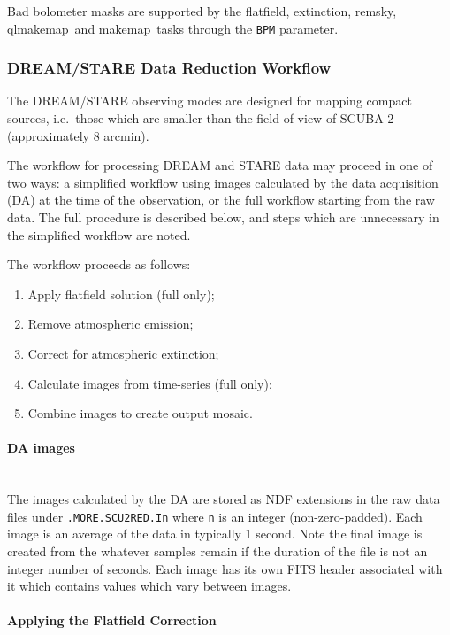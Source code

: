 \documentclass[twoside,11pt]{article}
\newcommand{\xref}[3]{#1}
\newcommand{\xlabel}[1]{}
\renewcommand{\_}{\texttt{\symbol{95}}}
\newcommand{\task}[1]{\textsf{#1}}
\newcommand{\qlmakemap}{\xref{\task{qlmakemap}}{sun258}{QLMAKEMAP}}
\newcommand{\extinction}{\xref{\task{extinction}}{sun258}{EXTINCTION}}
\newcommand{\flatfield}{\xref{\task{flatfield}}{sun258}{FLATFIELD}}
\newcommand{\makemap}{\xref{\task{makemap}}{sun258}{MAKEMAP}}
\newcommand{\remsky}{\xref{\task{remsky}}{sun258}{REMSKY}}
\newcommand{\aparam}[1]{\texttt{#1}}     %
\begin{document}
Bad bolometer masks are supported by the \flatfield, \extinction,
\remsky, \qlmakemap\ and \makemap\ tasks through the \aparam{BPM}
parameter.

\subsubsection{\xlabel{dsworkflow}DREAM/STARE Data Reduction Workflow\label{se:dsworkflow}}

The DREAM/STARE observing modes are designed for mapping compact
sources, i.e.\ those which are smaller than the field of view of
SCUBA-2 (approximately 8 arcmin).

The workflow for processing DREAM and STARE data may proceed in one of
two ways: a simplified workflow using images calculated by the data
acquisition (DA) at the time of the observation, or the full workflow
starting from the raw data. The full procedure is described below, and
steps which are unnecessary in the simplified workflow are noted.

The workflow proceeds as follows:
\begin{enumerate}
\item Apply flatfield solution (full only);
\item Remove atmospheric emission;
\item Correct for atmospheric extinction;
\item Calculate images from time-series (full only);
\item Combine images to create output mosaic.
\end{enumerate}

\paragraph{DA images} \ \\

The images calculated by the DA are stored as NDF extensions in the
raw data files under \texttt{.MORE.SCU2RED.In} where \texttt{n} is an
integer (non-zero-padded). Each image is an average of the data in
typically 1 second. Note the final image is created from the whatever
samples remain if the duration of the file is not an integer number of
seconds. Each image has its own FITS header associated with it which
contains values which vary between images.

\paragraph{\xlabel{flatfield}Applying the Flatfield Correction\label{se:flatfield}} \ \\
\end{document}
